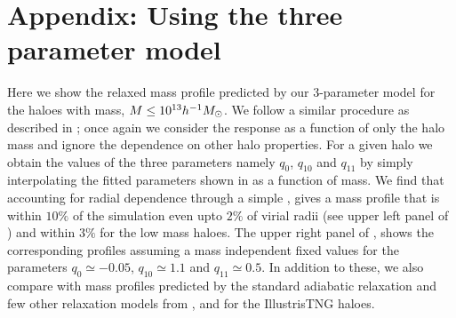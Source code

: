 \section{Appendix: Using the three parameter model}
\label{sec:apndx-demo-ch:simbase}
Here we show the relaxed mass profile predicted by our 3-parameter model  for the haloes with mass, $M\leq10^{13}h^{-1}M_{\odot}$. We follow a similar procedure as described in ; once again we consider the response as a function of only the halo mass and ignore the dependence on other halo properties. For a given halo we obtain the values of the three parameters namely $q_0$, $q_{10}$ and $q_{11}$ by simply interpolating the fitted parameters shown in  as a function of mass. We find that accounting for radial dependence through a simple , gives a mass profile that is within $10\%$ of the simulation even upto $2 \%$ of virial radii (see upper left panel of ) and within $3 \%$ for the low mass haloes. The upper right panel of , shows the corresponding profiles assuming a mass independent fixed values for the parameters $q_0\simeq-0.05$, $q_{10}\simeq1.1$ and $q_{11}\simeq0.5$. In addition to these, we also compare with mass profiles predicted by the standard adiabatic relaxation \citealp{1986ApJ...301...27B} and few other relaxation models from \citet{2004ApJ...616...16G}, \citet{2021MNRAS.507..632P} and \citet{2020MNRAS.494.4291C} for the IllustrisTNG haloes.

